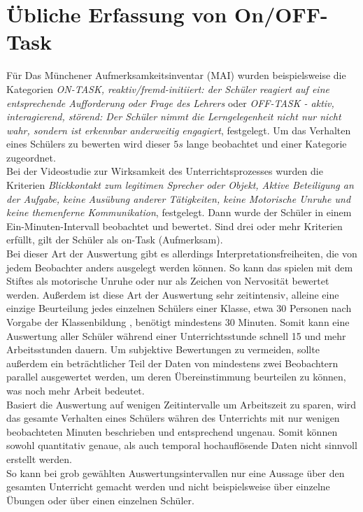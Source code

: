 \section{Übliche Erfassung von On/OFF-Task}
Für \glqq Das Münchener Aufmerksamkeitsinventar (MAI)\grqq \cite{MAI_Verhaltensbeobachtung} wurden beispielsweise die Kategorien \textit{\glqq ON-TASK, reaktiv/fremd-initiiert: der Schüler reagiert auf eine entsprechende Aufforderung oder Frage des Lehrers\grqq} oder \textit{\glqq OFF-TASK - aktiv, interagierend, störend: Der Schüler nimmt die Lerngelegenheit nicht nur nicht wahr, sondern ist erkennbar anderweitig engagiert\grqq}, festgelegt. Um das Verhalten eines Schülers zu bewerten wird dieser $5s$ lange beobachtet und einer Kategorie zugeordnet.\\
Bei der \glqq Videostudie zur Wirksamkeit des Unterrichtsprozesses \grqq \cite{aufmerksamkeit_Studie} wurden die Kriterien \textit{\glqq Blickkontakt zum legitimen Sprecher oder Objekt, Aktive Beteiligung an der Aufgabe, keine Ausübung anderer Tätigkeiten, keine Motorische Unruhe und keine themenferne Kommunikation\grqq}, festgelegt. Dann wurde der Schüler in einem Ein-Minuten-Intervall beobachtet und bewertet. Sind drei oder mehr Kriterien erfüllt, gilt der Schüler als on-Task (Aufmerksam).\\
Bei dieser Art der Auswertung gibt es allerdings Interpretationsfreiheiten, die von jedem Beobachter anders ausgelegt werden können. So kann das spielen mit dem Stiftes als motorische Unruhe oder nur als Zeichen von Nervosität bewertet werden. Außerdem ist diese Art der Auswertung sehr zeitintensiv, alleine eine einzige Beurteilung jedes einzelnen Schülers einer Klasse, etwa 30 Personen nach Vorgabe der Klassenbildung \cite{klassenteiler}, benötigt mindestens 30 Minuten. Somit kann eine Auswertung aller Schüler während einer Unterrichtsstunde schnell 15 und mehr Arbeitsstunden dauern. Um subjektive Bewertungen zu vermeiden, sollte außerdem ein beträchtlicher Teil der Daten von mindestens zwei Beobachtern parallel ausgewertet werden, um deren Übereinstimmung beurteilen zu können, was noch mehr Arbeit bedeutet.\\
Basiert die Auswertung auf wenigen Zeitintervalle um Arbeitszeit zu sparen, wird das gesamte Verhalten eines Schülers währen des Unterrichts mit nur wenigen beobachteten Minuten beschrieben und entsprechend ungenau. Somit können sowohl quantitativ genaue, als auch temporal hochauflösende Daten nicht sinnvoll erstellt werden.\\
So kann bei grob gewählten Auswertungsintervallen nur eine Aussage über den gesamten Unterricht gemacht werden und nicht beispielsweise über einzelne Übungen oder über einen einzelnen Schüler.